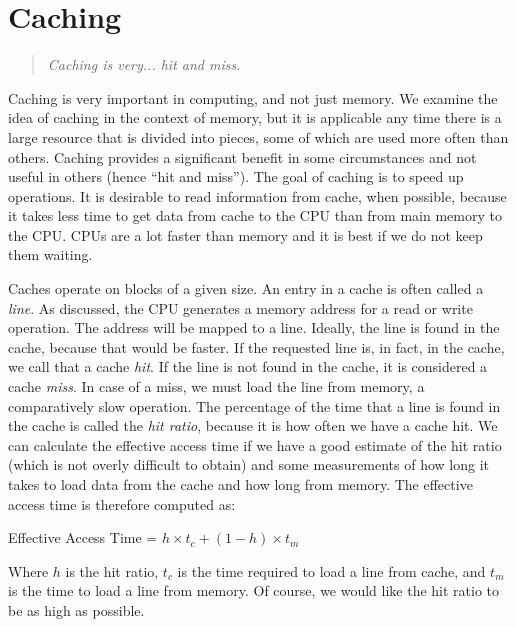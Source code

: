 




\section*{Caching}
\begin{quote}
\textit{Caching is very... hit and miss.}
\end{quote}


Caching is very important in computing, and not just memory. We examine the idea of caching in the context of memory, but it is applicable any time there is a large resource that is divided into pieces, some of which are used more often than others. Caching provides a significant benefit in some circumstances and not useful in others (hence ``hit and miss''). The goal of caching is to speed up operations. It is desirable to read information from cache, when possible, because it takes less time to get data from cache to the CPU than from main memory to the CPU. CPUs are a lot faster than memory and it is best if we do not keep them waiting.

Caches operate on blocks of a given size. An entry in a cache is often called a \textit{line}. As discussed, the CPU generates a memory address for a read or write operation. The address will be mapped to a line. Ideally, the line is found in the cache, because that would be faster. If the requested line is, in fact,  in the cache, we call that a cache \textit{hit}. If the line is not found in the cache, it is considered a cache \textit{miss}. In case of a miss, we must load the line from memory, a comparatively slow operation. The percentage of the time that a line is found in the cache is called the \textit{hit ratio}, because it is how often we have a cache hit. We can calculate the effective access time if we have a good estimate of the hit ratio (which is not overly difficult to obtain) and some measurements of how long it takes to load data from the cache and how long from memory. The effective access time is therefore computed as:

\begin{center}
Effective Access Time = $h \times t_{c} + (1-h) \times t_{m}$
\end{center}

Where $h$ is the hit ratio, $t_{c}$ is the time required to load a line from cache, and $t_{m}$ is the time to load a line from memory. Of course, we would like the hit ratio to be as high as possible.

